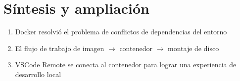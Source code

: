 \section{Síntesis y ampliación}
\begin{enumerate}
  \item Docker resolvió el problema de conflictos de dependencias del entorno
  \item El flujo de trabajo de imagen $\to$ contenedor $\to$ montaje de disco
  \item VSCode Remote se conecta al contenedor para lograr una experiencia de desarrollo local
\end{enumerate}


